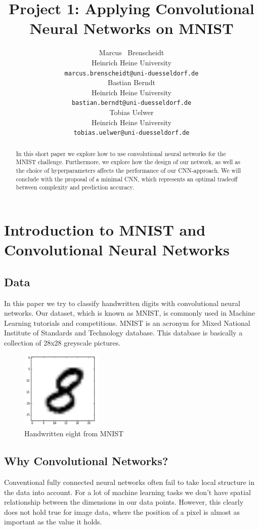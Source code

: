 \documentclass{article}
\title{Project 1: Applying Convolutional Neural Networks on MNIST}
\author{
  Marcus ~Brenscheidt \\
  Heinrich Heine University\\
  \texttt{marcus.brenscheidt@uni-duesseldorf.de} \\
  \And
  Bastian Berndt \\
  Heinrich Heine University\\
  \texttt{bastian.berndt@uni-duesseldorf.de} \\
  \And
  Tobias Uelwer \\
  Heinrich Heine University\\
  \texttt{tobias.uelwer@uni-duesseldorf.de} \\
}
\begin{document}

\maketitle

\begin{abstract}
  In this short paper we explore how to use convolutional neural networks for the MNIST challenge. Furthermore, we explore how the design of our network, as well as the choice of hyperparameters affects the performance of our CNN-approach. We will conclude with the proposal of a minimal CNN, which represents an optimal tradeoff between complexity and prediction accuracy.
\end{abstract}

\section{Introduction to MNIST and Convolutional Neural Networks}
\subsection{Data}
In this paper we try to classify handwritten digits with convolutional neural networks. Our dataset, which is known as MNIST, is commonly used in Machine Learning tutorials and competitions. MNIST is an acronym for Mixed National Institute of Standards and Technology database. This database is basically a collection of 28x28 greyscale pictures.

\begin{figure}[h]
\centering
\includegraphics[width=0.35\textwidth]{imgs/8.png}
\caption{Handwritten eight from MNIST}\label{acht}
\end{figure}

\subsection{Why Convolutional Networks?}
Conventional fully connected neural networks often fail to take local structure in the data into account. For a lot of machine learning tasks we don't have spatial relationship between the dimensions in our data points. However, this clearly does not hold true for image data, where the position of a pixel is almost as important as the value it holds.
\end{document}
